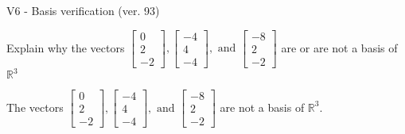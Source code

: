 \begin{exercise}
  \begin{exerciseTitle}V6 - Basis verification (ver. 93)\end{exerciseTitle}
  \begin{exerciseStatement}
    Explain why the vectors \(\left[\begin{array}{r}
0 \\
2 \\
-2
\end{array}\right] , \left[\begin{array}{r}
-4 \\
4 \\
-4
\end{array}\right] , \text{ and } \left[\begin{array}{r}
-8 \\
2 \\
-2
\end{array}\right]\) are or are not a basis of \(\mathbb{R}^3\)	


  \end{exerciseStatement}
  \begin{exerciseAnswer}
   The vectors \(\left[\begin{array}{r}
0 \\
2 \\
-2
\end{array}\right] , \left[\begin{array}{r}
-4 \\
4 \\
-4
\end{array}\right] , \text{ and } \left[\begin{array}{r}
-8 \\
2 \\
-2
\end{array}\right]\) 
  	 are not  a basis of \(\mathbb{R}^3\).
  


  \end{exerciseAnswer}
\end{exercise}